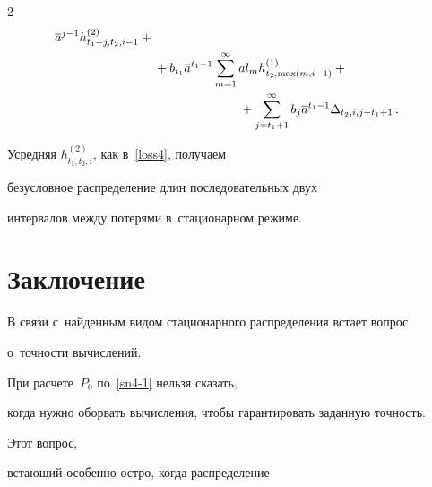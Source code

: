 \begin{multicols}{2}
\begin{align*}
\overline{a}^{j-1} h^{(2)}_{t_1-j,t_2,i-1}+{}\\


&{} + b_{t_1}


\overline{a}^{t_1-1}


\sum\limits_{m=1}^{\infty} a l_m


h^{(1)}_{t_2,\max(m,i-1)}+{}\\


&\hspace*{24mm}{}+ \sum\limits_{j=t_1+1}^{\infty}


b_j \overline{a}^{t_1-1}


\Delta_{t_2,i,j-t_1+1}\,.


\end{align*}





\vspace*{-2pt}





\noindent Усредняя $h^{(2)}_{t_1,t_2,i}$, как в~\eqref{loss4}, получаем


безусловное распределение длин последовательных двух


интервалов между потерями в~стационарном режиме.









\vspace*{-6pt}





\section{Заключение}





В связи с~найденным видом стационарного распределения встает вопрос 


о~точности вычислений.


При расчете~$P_0$ по~\eqref{sn4-1} нельзя сказать,


когда нужно оборвать вычисления, чтобы гарантировать заданную точность. 


Этот вопрос,


встающий особенно остро, когда распределение



\end{multicols}
